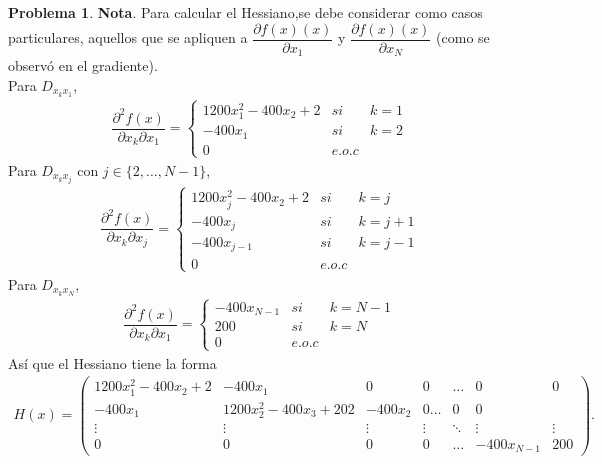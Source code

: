 \documentclass[12pt,letterpaper]{article}
\theoremstyle{definition}
\newtheorem{problm}{Problema}
\begin{document}
\begin{problm}
	\textbf{Nota}. Para calcular el Hessiano,se debe considerar como casos particulares, aquellos que se apliquen a $ \dfrac{\partial f(x) (x)}{\partial x_1} $ y $ \dfrac{\partial f(x) (x)}{\partial x_N} $ (como se observó en el gradiente). 
	\\
	Para $ D_{x_k x_1 } $,
	\begin{eqnarray*}
		\dfrac{\partial^2 f(x)}{\partial x_k \partial x_1} = \left\{\begin{matrix}
																	1200x_1^2 -400 x_2 +2 & si & k = 1 \\
																	-400x_1				  & si & k = 2 \\
																	0					  & e.o.c &
															 \end{matrix}\right.
	\end{eqnarray*}
	Para $ D_{x_k x_j} $ con $ j \in\{ 2,\dots, N-1 \} $,
	\begin{eqnarray*}
		\dfrac{\partial^2 f(x)}{\partial x_k \partial x_j} = \left\{\begin{matrix}
			1200x_j^2 -400 x_2 +2 & si & k = j   \\
			-400x_j				  & si & k = j+1 \\
			-400 x_{j-1}          & si & k = j-1 \\
			0					  & e.o.c &
		\end{matrix}\right.
	\end{eqnarray*}
	Para $ D_{x_k x_N} $,
	\begin{eqnarray*}
		\dfrac{\partial^2 f(x)}{\partial x_k \partial x_1} = \left\{\begin{matrix}
			-400 x_{N-1} & si & k = N - 1 \\
			200		     & si & k = N \\
			0					  & e.o.c &
		\end{matrix}\right.
	\end{eqnarray*}
	Así que el Hessiano tiene la forma
	\begin{eqnarray}
		H(x) = \left( \begin{matrix}
							1200x_1^2 -400 x_2 +2  & -400 x_1 & 0 & 0 & \dots & 0 & 0 \\
							-400 x_1 & 1200x_2^2 - 400 x_3 + 202 & -400 x_2 & 0 \dots & 0 & 0 \\
							\vdots & \vdots & \vdots & \vdots & \ddots & \vdots & \vdots \\
							0 & 0 & 0 & 0 & \dots & -400x_{N-1} & 200
		\end{matrix} \right).
	\end{eqnarray}
\end{problm}
\end{document}
